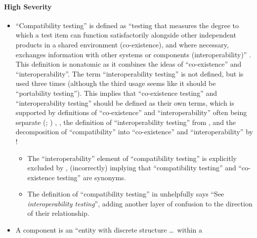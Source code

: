 \ifnotpaper\paragraph{High Severity}\fi
\begin{itemize}
    \item ``Compatibility testing'' is defined as ``testing that measures the
          degree to which a test item can function satisfactorily alongside
          other independent products in a shared environment (co-existence),
          and where necessary, exchanges information with other systems or
          components (interoperability)'' \citep[p.~3]{IEEE2022}. This
          definition is nonatomic as it combines the ideas of ``co-existence''
          and ``interoperability''. The term ``interoperability testing'' is
          not defined, but is used three times \citep[pp.~22,~43]{IEEE2022}
          (although the third usage seems like it should be ``portability
          testing''). This implies that ``co-existence testing'' and
          ``interoperability testing'' should be defined as their own terms,
          which is supported by definitions of ``co-existence'' and
          ``interoperability'' often being separate
          \ifnotpaper
              (\citealpISTQB{}; \citealp[pp.~73,~237]{IEEE2017})%
          \else
              \cite[pp.~73,~237]{IEEE2017}, \cite{ISTQB}%
          \fi, the definition of
          ``interoperability testing'' from \citet[p.~238]{IEEE2017},
          and the decomposition of ``compatibility'' into ``co-existence''
          and ``interoperability'' by \citet{ISO_IEC2023a}!
          \begin{itemize}
              \item %
                    The ``interoperability'' element of ``compatibility
                    testing'' is explicitly excluded by
                    \citet[p.~37]{IEEE2021}, (incorrectly) implying that
                    ``compatibility testing'' and ``co-existence testing''
                    are synonyms.
              \item %
                    The definition of ``compatibility testing'' in
                    \citep[p.~43]{Kam2008} unhelpfully says ``See
                    \emph{interoperability testing}'', adding another
                    layer of confusion to the direction of their
                    relationship.
          \end{itemize}
    \item A component is an ``entity with discrete structure \dots\ within a

\end{itemize}

